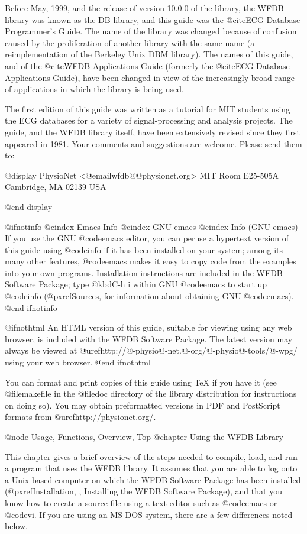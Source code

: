 Before May, 1999, and the release of version 10.0.0 of the library, the
WFDB library was known as the DB library, and this guide was the @cite{ECG
Database Programmer's Guide}.  The name of the library was changed because
of confusion caused by the proliferation of another library with
the same name (a reimplementation of the Berkeley Unix DBM library).
The names of this guide, and of the @cite{WFDB Applications Guide} (formerly
the @cite{ECG Database Applications Guide}), have been changed in view of
the increasingly broad range of applications in which the library is being
used.

The first edition of this guide was written as a tutorial for MIT
students using the ECG databases for a variety of signal-processing and
analysis projects.  The guide, and the WFDB library itself, have been
extensively revised since they first appeared in 1981.  Your comments
and suggestions are welcome.  Please send them to:

@display
PhysioNet  <@email{wfdb@@physionet.org}>
MIT Room E25-505A
Cambridge, MA 02139
USA

@end display

@ifnotinfo
@cindex Emacs Info
@cindex GNU emacs
@cindex Info (GNU emacs)
If you use the GNU @code{emacs} editor, you can peruse a hypertext
version of this guide using @code{info} if it has been installed on your
system; among its many other features, @code{emacs} makes it easy to
copy code from the examples into your own programs.  Installation
instructions are included in the WFDB Software Package; type @kbd{C-h i}
within GNU @code{emacs} to start up @code{info} (@pxref{Sources}, for
information about obtaining GNU @code{emacs}).
@end ifnotinfo

@ifnothtml
An HTML version of this guide, suitable for viewing using any web browser,
is included with the WFDB Software Package.  The latest version may always be
viewed at @uref{http://@-physio@-net.@-org/@-physio@-tools/@-wpg/} using your web
browser.
@end ifnothtml

You can format and print copies of this guide using TeX if you have it (see
@file{makefile} in the @file{doc} directory of the library distribution for
instructions on doing so).  You may obtain preformatted versions in PDF and
PostScript formats from @uref{http://physionet.org/}.


@node     Usage, Functions, Overview, Top
@chapter Using the WFDB Library

This chapter gives a brief overview of the steps needed to compile,
load, and run a program that uses the WFDB library.  It assumes that you
are able to log onto a Unix-based computer on which the WFDB Software
Package has been installed
(@pxref{Installation, , Installing the WFDB Software Package}),
and that you know how to create a source file using a text editor such
as @code{emacs} or @code{vi}.  If you are using an MS-DOS system, there
are a few differences noted below.


